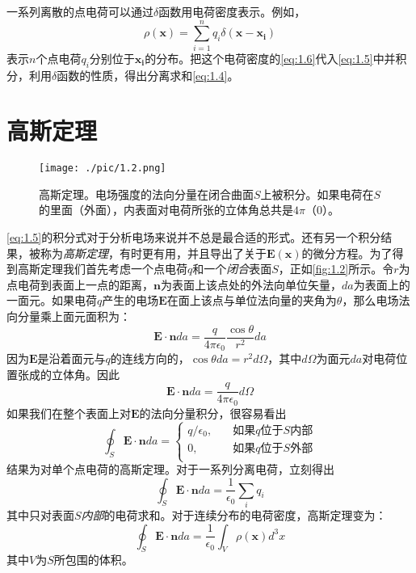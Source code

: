 \documentclass[12pt]{book}
\numberwithin{equation}{chapter}
\numberwithin{figure}{chapter}
\numberwithin{footnote}{page}
\begin{document}
{一系列离散的点电荷可以通过$\delta$函数用电荷密度表示。例如，
\begin{equation}\label{eq:1.6}
    \rho(\mathbf{x})=\sum_{i=1}^n q_i\delta(\mathbf{x}-\mathbf{x_i})
\end{equation}
表示$n$个点电荷$q_i$分别位于$\mathbf{x_i}$的分布。把这个电荷密度的\autoref{eq:1.6}代入\autoref{eq:1.5}中并积分，利用$\delta$函数的性质，得出分离求和\autoref{eq:1.4}。}

\section{高斯定理}\label{sec:1.3}

\begin{figure}[!ht]
    \centering
    \texttt{[image: ./pic/1.2.png]}
    \captionsetup{justification=raggedright, singlelinecheck=false}
    \caption{高斯定理。电场强度的法向分量在闭合曲面$S$上被积分。如果电荷在$S$的里面（外面），内表面对电荷所张的立体角总共是$4\pi$（0）。}
    \label{fig:1.2}
\end{figure}

\autoref{eq:1.5}的积分式对于分析电场来说并不总是最合适的形式。还有另一个积分结果，被称为\textit{高斯定理}，有时更有用，并且导出了关于$\mathbf{E}(\mathbf{x})$的微分方程。为了得到高斯定理我们首先考虑一个点电荷$q$和一个\textit{闭合}表面$S$，正如\autoref{fig:1.2}所示。令$r$为点电荷到表面上一点的距离，$\mathbf{n}$为表面上该点处的外法向单位矢量，$da$为表面上的一面元。如果电荷$q$产生的电场$\mathbf{E}$在面上该点与单位法向量的夹角为$\theta$，那么电场法向分量乘上面元面积为：
\begin{equation}\label{eq:1.7}
    \mathbf{E}\cdot\mathbf{n}da=\frac{q}{4\pi\epsilon_0}\frac{\cos \theta}{r^2}da
\end{equation}
因为$\mathbf{E}$是沿着面元与$q$的连线方向的，$\cos \theta da=r^2 d\Omega$，其中$d\Omega$为面元$da$对电荷位置张成的立体角。因此
\begin{equation}\label{eq:1.8}
    \mathbf{E}\cdot\mathbf{n}da=\frac{q}{4\pi\epsilon_0}d\Omega
\end{equation}
如果我们在整个表面上对$\mathbf{E}$的法向分量积分，很容易看出
\begin{equation}\label{eq:1.9}
    \oint_{S}\mathbf{E}\cdot\mathbf{n}da=\left\{
    \begin{aligned}
        q/\epsilon_0,&\quad \mbox{如果}q\mbox{位于}S\mbox{内部}\\
        0,&\quad \mbox{如果}q\mbox{位于}S\mbox{外部}\\
    \end{aligned}\right.
\end{equation}
结果为对单个点电荷的高斯定理。对于一系列分离电荷，立刻得出
\begin{equation}\label{eq:1.10}
     \oint_{S}\mathbf{E}\cdot\mathbf{n}da=\frac{1}{\epsilon_0}\sum_i q_i
\end{equation}
其中只对表面$S$\textit{内部}的电荷求和。对于连续分布的电荷密度，高斯定理变为：
\begin{equation}\label{eq:1.11}
     \oint_{S}\mathbf{E}\cdot\mathbf{n}da=\frac{1}{\epsilon_0}\int_V \rho(\mathbf{x})d^3x
\end{equation}
其中$V$为$S$所包围的体积。
\end{document}

